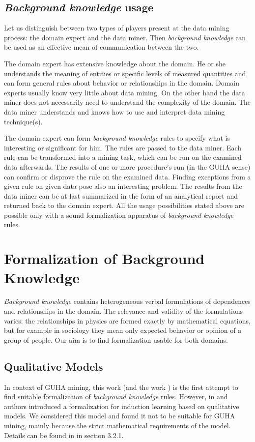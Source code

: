 \documentclass{llncs}
\begin{document}
\subsection{\emph{Background knowledge} usage}
Let us distinguish between two types of players present at the data mining process: 
the domain expert and the data miner. Then \emph{background knowledge} can be used
as an effective mean of communication between the two. 

The domain expert has extensive knowledge about the domain. He or she understands 
the meaning of entities or specific levels of measured quantities and can form 
general rules about behavior or relationships in the domain. Domain experts usually know
very little about data mining. On the other hand the data miner does not 
necessarily need to understand the complexity of the domain. The data miner understands
and knows how to use and interpret data mining technique(s).

The domain expert can form \emph{background knowledge} rules to specify what is
interesting or significant for him. The rules are passed to the data miner.
Each rule can be transformed into a mining task, which can be run on the examined
data afterwards. The results of one or more procedure's run (in the GUHA sense)
can confirm or disprove the rule on the examined data. Finding exceptions from a
given rule on given data pose also an interesting problem. The results from
the data miner can be at last summarized in the form of an analytical report and
returned back to the domain expert. All the usage possibilities stated above are
possible only with a sound formalization apparatus of \emph{background knowledge}
rules.

\section{Formalization of Background Knowledge}
\emph{Background knowledge} contains heterogeneous verbal formulations of dependences
and relationships in the domain. The relevance and validity of the formulations varies:
the relationships in physics are formed exactly by mathematical equations, but for
example in sociology they mean only expected behavior or opinion of a group of people.
Our aim is to find formalization usable for both domains.

\subsection{Qualitative Models}
\label{section:models}
In context of GUHA mining, this work (and the work \cite{Diplomka}) is the first
attempt to find suitable formalization of \emph{background knowledge} rules.
However, in \cite{Qualitative1} and \cite{Qualitative2} authors introduced
a formalization for induction learning based on qualitative models. 
We considered this model and found it not to be suitable for GUHA mining, mainly
because the strict mathematical requirements of the model. Details can be found
in \cite{Diplomka} in section 3.2.1.
\end{document}
